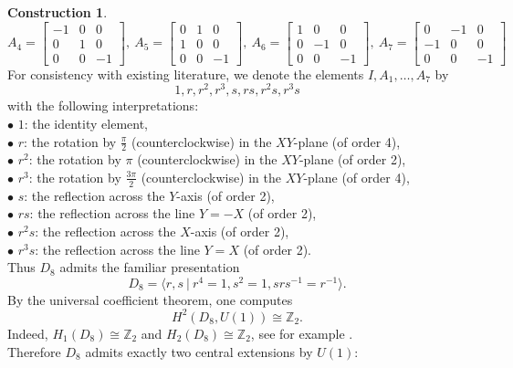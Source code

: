 \documentclass{article}
\theoremstyle{plain}
\theoremstyle{definition}
\newtheorem{const}[thm]{Construction}
\begin{document}
\begin{const}
\[\]
\[
A_4=\begin{bmatrix} -1 & 0 & 0 \\ 0 & 1 & 0 \\ 0 & 0 & -1  \end{bmatrix}, ~ A_5=\begin{bmatrix} 0 & 1 & 0 \\ 1 & 0 & 0 \\ 0 & 0 & -1  \end{bmatrix}, ~ A_6=\begin{bmatrix} 1 & 0 & 0 \\ 0 & -1 & 0 \\ 0 & 0 & -1  \end{bmatrix}, ~ A_7=\begin{bmatrix} 0 & -1 & 0 \\ -1 & 0 & 0 \\ 0 & 0 & -1  \end{bmatrix}
\]
For consistency with existing literature, we denote the elements $I, A_1,\dots,A_7$ by
$$1, r, r^2, r^3, s, rs, r^2s, r^3s$$
with the following interpretations: \\
$\bullet$ $1$: the identity element, \\
$\bullet$ $r$: the rotation by $\frac{\pi}{2}$ (counterclockwise) in the $XY$-plane (of order 4), \\
$\bullet$ $r^2$: the rotation by $\pi$ (counterclockwise) in the $XY$-plane (of order 2), \\
$\bullet$ $r^3$: the rotation by $\frac{3\pi}{2}$ (counterclockwise) in the $XY$-plane (of order 4), \\
$\bullet$ $s$: the reflection across the $Y$-axis (of order 2), \\
$\bullet$ $rs$: the reflection across the line $Y=-X$ (of order 2), \\
$\bullet$ $r^2s$: the reflection across the $X$-axis (of order 2), \\
$\bullet$ $r^3s$: the reflection across the line $Y=X$ (of order 2). \\
Thus $D_8$ admits the familiar presentation
\[
D_8 = \langle r,s ~ \big\vert ~ r^4 = 1, s^2 = 1, srs^{-1} = r^{-1} \rangle.
\]
By the universal coefficient theorem, one computes
\[
H^2(D_8,U(1)) \cong \mathbb{Z}_2.
\]
Indeed, $H_1(D_8) \cong \mathbb{Z}_2$ and $H_2(D_8) \cong \mathbb{Z}_2$, see for example \cite[Example 6.8.4 on page 196 and Example 6.8.5 on page 197]{MR1269324}. \\
Therefore $D_8$ admits exactly two central extensions by $U(1)$: \\

\end{const}
\end{document}
